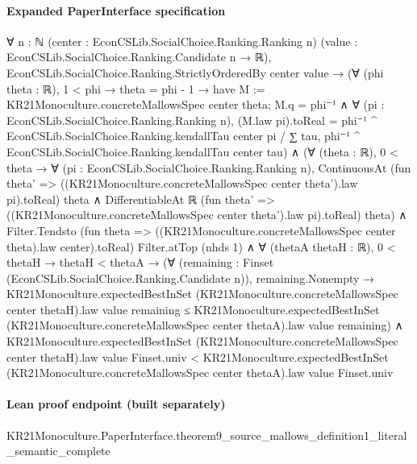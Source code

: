\documentclass[10pt]{article}
\begin{document}
\paragraph{Expanded PaperInterface specification}
\begin{ReviewVerbatim}
∀ {n : ℕ} (center : EconCSLib.SocialChoice.Ranking.Ranking n) (value : EconCSLib.SocialChoice.Ranking.Candidate n → ℝ),
  EconCSLib.SocialChoice.Ranking.StrictlyOrderedBy center value →
    (∀ (phi theta : ℝ),
        1 < phi →
          theta = phi - 1 →
            have M := KR21Monoculture.concreteMallowsSpec center theta;
            M.q = phi⁻¹ ∧
              ∀ (pi : EconCSLib.SocialChoice.Ranking.Ranking n),
                (M.law pi).toReal =
                  phi⁻¹ ^ EconCSLib.SocialChoice.Ranking.kendallTau center pi /
                    ∑ tau, phi⁻¹ ^ EconCSLib.SocialChoice.Ranking.kendallTau center tau) ∧
      (∀ (theta : ℝ),
          0 < theta →
            ∀ (pi : EconCSLib.SocialChoice.Ranking.Ranking n),
              ContinuousAt (fun theta' => ((KR21Monoculture.concreteMallowsSpec center theta').law pi).toReal) theta ∧
                DifferentiableAt ℝ (fun theta' => ((KR21Monoculture.concreteMallowsSpec center theta').law pi).toReal)
                  theta) ∧
        Filter.Tendsto (fun theta => ((KR21Monoculture.concreteMallowsSpec center theta).law center).toReal)
            Filter.atTop (nhds 1) ∧
          ∀ (thetaA thetaH : ℝ),
            0 < thetaH →
              thetaH < thetaA →
                (∀ (remaining : Finset (EconCSLib.SocialChoice.Ranking.Candidate n)),
                    remaining.Nonempty →
                      KR21Monoculture.expectedBestInSet (KR21Monoculture.concreteMallowsSpec center thetaH).law value
                          remaining ≤
                        KR21Monoculture.expectedBestInSet (KR21Monoculture.concreteMallowsSpec center thetaA).law value
                          remaining) ∧
                  KR21Monoculture.expectedBestInSet (KR21Monoculture.concreteMallowsSpec center thetaH).law value
                      Finset.univ <
                    KR21Monoculture.expectedBestInSet (KR21Monoculture.concreteMallowsSpec center thetaA).law value
                      Finset.univ
\end{ReviewVerbatim}

\paragraph{Lean proof endpoint (built separately)}\begin{ReviewVerbatim}
KR21Monoculture.PaperInterface.theorem9_source_mallows_definition1_literal_semantic_complete
\end{ReviewVerbatim}
\end{document}
